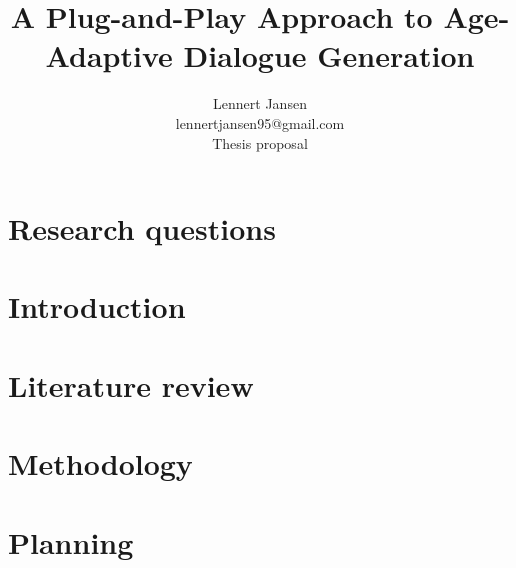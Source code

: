 \documentclass[20pt]{article}
\title{A Plug-and-Play Approach to Age-Adaptive Dialogue Generation}
\author{%
  Lennert Jansen\\
  lennertjansen95@gmail.com \\
  Thesis proposal
}
\begin{document}
 
\maketitle

\tableofcontents

\newpage
\section{Research questions}


\newpage
\section{Introduction}


\section{Literature review}


\section{Methodology}
\label{sec:methods}



% 


\section{Planning}
\label{sec:plan}


\newpage


\end{document}
